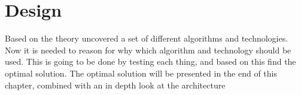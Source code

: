 \chapter{Design}
Based on the theory uncovered a set of different algorithms and technologies.
Now it is needed to reason for why which algorithm and technology should be used.
This is going to be done by testing each thing, and based on this find the optimal solution.
The optimal solution will be presented in the end of this chapter, combined with an in depth look at the architecture



